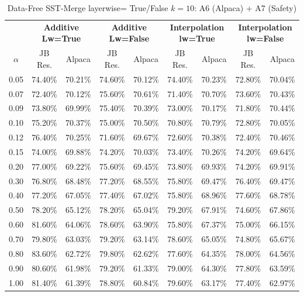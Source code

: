 \begin{table}[h]
\centering
\caption{Data-Free SST-Merge layerwise= True/False $k=10$: A6 (Alpaca) + A7 (Safety)}
\label{tab:res_a6_data_free_sst_10}
\begin{tabular}{c|cc|cc|cc|cc}
\hline
 & \multicolumn{2}{c|}{\textbf{Additive Lw=True}} & \multicolumn{2}{c|}{\textbf{Additive Lw=False}} & \multicolumn{2}{c|}{\textbf{Interpolation lw=True}}& \multicolumn{2}{c}{\textbf{Interpolation lw=False}} \\
$\alpha$ & JB Res. & Alpaca & JB Res. & Alpaca & JB Res. & Alpaca & JB Res. & Alpaca \\
\hline
0.05 & 74.40\% & 70.21\% & 74.60\% & 70.12\% & 74.40\% & 70.23\% & 72.80\% & 70.04\% \\
0.07 & 72.40\% & 70.12\% & 75.60\% & 70.61\% & 71.40\% & 70.70\% & 73.60\% & 70.43\% \\
0.09 & 73.80\% & 69.99\% & 75.40\% & 70.39\% & 73.00\% & 70.17\% & 71.80\% & 70.44\% \\
0.10 & 75.20\% & 70.37\% & 75.00\% & 70.50\% & 70.80\% & 70.79\% & 72.80\% & 70.05\% \\
0.12 & 76.40\% & 70.25\% & 71.60\% & 69.67\% & 72.60\% & 70.38\% & 72.40\% & 70.46\% \\
0.15 & 74.00\% & 69.88\% & 74.20\% & 70.03\% & 73.40\% & 70.26\% & 74.20\% & 69.64\% \\
0.20 & 77.00\% & 69.22\% & 75.60\% & 69.45\% & 73.80\% & 69.93\% & 74.20\% & 69.91\% \\
0.30 & 76.80\% & 68.48\% & 77.20\% & 68.55\% & 75.80\% & 69.47\% & 76.40\% & 69.47\% \\
0.40 & 77.20\% & 67.05\% & 77.40\% & 67.02\% & 75.80\% & 68.96\% & 77.60\% & 68.78\% \\
0.50 & 78.20\% & 65.12\% & 78.20\% & 65.04\% & 79.20\% & 67.91\% & 74.60\% & 67.86\% \\
0.60 & 81.60\% & 64.06\% & 78.60\% & 63.90\% & 75.80\% & 67.37\% & 75.00\% & 66.15\% \\
0.70 & 79.80\% & 63.03\% & 79.20\% & 63.14\% & 78.60\% & 65.05\% & 74.80\% & 65.67\% \\
0.80 & 83.60\% & 62.72\% & 79.80\% & 62.62\% & 77.60\% & 64.35\% & 78.00\% & 64.56\% \\
0.90 & 80.60\% & 61.98\% & 79.20\% & 61.33\% & 79.00\% & 64.30\% & 77.80\% & 63.59\% \\
1.00 & 81.40\% & 61.39\% & 78.80\% & 60.84\% & 79.60\% & 63.17\% & 77.40\% & 62.97\% \\
\hline
\end{tabular}
\end{table}
\FloatBarrier

